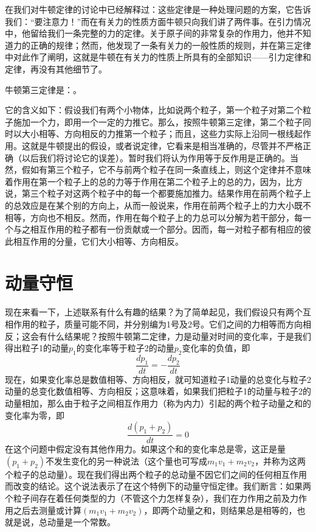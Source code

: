 在我们对牛顿定律的讨论中已经解释过：这些定律是一种处理问题的方案，它告诉我们：“要注意力！”而在有关力的性质方面牛顿只向我们讲了两件事。在引力情况中，他留给我们一条完整的力的定律。关于原子间的非常复杂的作用力，他并不知道力的正确的规律；然而，他发现了一条有关力的一般性质的规则，并在第三定律中对此作了阐明，这就是牛顿在有关力的性质上所具有的全部知识——引力定律和定律，再没有其他细节了。

牛顿第三定律是：。

它的含义如下：假设我们有两个小物体，比如说两个粒子，第一个粒子对第二个粒子施加一个力，即用一个一定的力推它。那么，按照牛顿第三定律，第二个粒子同时以大小相等、方向相反的力推第一个粒子；而且，这些力实际上沿同一根线起作用。这就是牛顿提出的假设，或者说定律，它看来是相当准确的，尽管并不严格正确（以后我们将讨论它的误差）。暂时我们将认为作用等于反作用是正确的。当然，假如有第三个粒子，它不与前两个粒子在同一条直线上，则这个定律并不意味着作用在第一个粒子上的总的力等于作用在第二个粒子上的总的力，因为，比方说，第三个粒子对这两个粒子中的每一个都要施加推力。结果作用在前两个粒子上的总效应是在某个别的方向上，从而一般说来，作用在前两个粒子上的力大小既不相等，方向也不相反。然而，作用在每个粒子上的力总可以分解为若干部分，每一个与之相互作用的粒子都有一份贡献或一个部分。因而，每一对粒子都有相应的彼此相互作用的分量，它们大小相等、方向相反。

\section{动量守恒}

现在来看一下，上述联系有什么有趣的结果？为了简单起见，我们假设只有两个互相作用的粒子，质量可能不同，并分别编为1号及2号。它们之间的力相等而方向相反；这会有什么结果呢？按照牛顿第二定律，力是动量对时间的变化率，于是我们得出粒子1的动量$p_1$的变化率等于粒子2的动量$p_2$变化率的负值，即
\begin{equation}
    \label{Eq:I:10:1}
    \frac{dp_1}{dt}=-\frac{dp_2}{dt}
\end{equation}
现在，如果变化率总是数值相等、方向相反，就可知道粒子1动量的总变化与粒子2动量的总变化数值相等、方向相反；这意味着，如果我们把粒子1的动量与粒子2的动量相加，那么由于粒子之间相互作用力（称为内力）引起的两个粒子动量之和的变化率为零，即
\begin{equation}
    \label{Eq:I:10:2}
    \frac{d(p_1+p_2)}{dt}=0
\end{equation}
在这个问题中假定没有其他作用力。如果这个和的变化率总是零，这正是量$(p_1+p_2)$不发生变化的另一种说法（这个量也可写成$m_1v_1+m_2v_2$，并称为这两个粒子的总动量）。现在我们得出两个粒子的总动量不因它们之间的任何相互作用而改变的结论。这个说法表示了在这个特例下的动量守恒定律。我们断言：如果两个粒子间存在着任何类型的力（不管这个力怎样复杂），我们在力作用之前及力作用之后去测量或计算$(m_1v_1+m_2v_2)$，即两个动量之和，则结果总是相等的，也就是说，总动量是一个常数。

